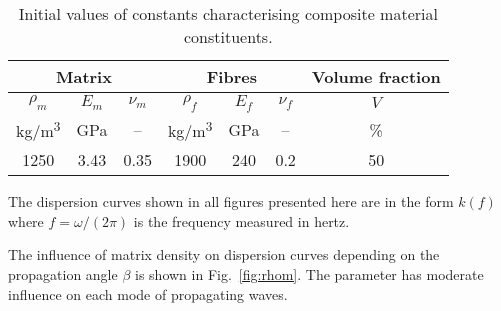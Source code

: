 \documentclass[preprint,12pt]{elsarticle}
\begin{document}
 \begin{table}[h]
 	\renewcommand{\arraystretch}{1.3}
 	\centering \footnotesize
 	\caption{Initial values of constants characterising composite material constituents.}
 	\begin{tabular}{ccccccc} 
 		\toprule
 		\multicolumn{3}{c}{\textbf{Matrix} }	& \multicolumn{3}{c}{\textbf{Fibres} } & \textbf{Volume fraction}	 \\ 
 		\midrule
 		$\rho_m$ & $E_m$ & $\nu_m$  & $\rho_f$ & $E_f$ & $\nu_f$ & $V$\\
 		kg/m\textsuperscript{3} &GPa& --  & kg/m\textsuperscript{3}  & GPa& -- & \%\\ 
 		\cmidrule(lr){1-3} \cmidrule(lr){4-6} \cmidrule(lr){7-7}
 		1250 &3.43& 0.35& 1900 & 240 & 0.2 & 50\\
 		\bottomrule 
 	\end{tabular} 
 	\label{tab:matprop}
 \end{table}
 
 The dispersion curves shown in all figures presented here are in the form $k(f)$ where $f=\omega/(2 \pi)$ is the frequency measured in hertz.
 
 The influence of matrix density on dispersion curves depending on the propagation angle $\beta$ is shown in Fig.~\ref{fig:rhom}. The parameter has moderate influence on each mode of propagating waves.
 
\end{document}
